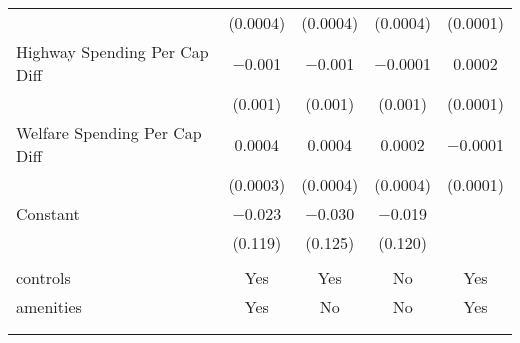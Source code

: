 \begin{table}[!htbp]
\begin{tabular}{@{\extracolsep{5pt}}lcccc}
  & (0.0004) & (0.0004) & (0.0004) & (0.0001) \\ 
  Highway Spending Per Cap Diff & $-$0.001 & $-$0.001 & $-$0.0001 & 0.0002 \\ 
  & (0.001) & (0.001) & (0.001) & (0.0001) \\ 
  Welfare Spending Per Cap Diff & 0.0004 & 0.0004 & 0.0002 & $-$0.0001 \\ 
  & (0.0003) & (0.0004) & (0.0004) & (0.0001) \\ 
  Constant & $-$0.023 & $-$0.030 & $-$0.019 &  \\ 
  & (0.119) & (0.125) & (0.120) &  \\ 
 \hline \\[-1.8ex] 
controls & Yes & Yes & No & Yes \\ 
amenities & Yes & No & No & Yes \\ 
\hline \\[-1.8ex] 
\hline 
\hline \\[-1.8ex] 
\end{tabular} 
\end{table} 
